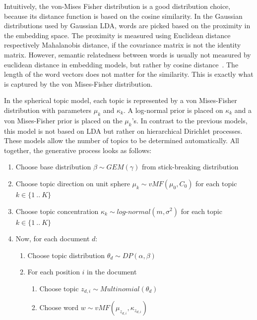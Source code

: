 \documentclass[
        a4paper,
        titlepage,
        twoside,
        parskip,
        numbers=noenddot
        ]{scrbook}
\theoremstyle{break}
\begin{document}
Intuitively, the von-Mises Fisher distribution is a good distribution choice, because its distance function is based on the cosine similarity.
In the Gaussian distributions used by Gaussian LDA, words are picked based on the proximity in the embedding space.
The proximity is measured using Euclidean distance respectively Mahalanobis distance, if the covariance matrix is not the identity matrix.
However, semantic relatedness between words is usually not measured by euclidean distance in embedding models, but rather by cosine distance~\cite{Mikolov2013a}.
The length of the word vectors does not matter for the similarity.
This is exactly what is captured by the von Mises-Fisher distribution.


In the spherical topic model, each topic is represented by a von Mises-Fisher distribution with parameters $\mu_k$ and $\kappa_k$.
A log-normal prior is placed on $\kappa_k$ and a von Mises-Fisher prior is placed on the $\mu_k$'s.
In contrast to the previous models, this model is not based on LDA but rather on hierarchical Dirichlet processes.
These models allow the number of topics to be determined automatically.
All together, the generative process looks as follows:
\begin{enumerate}
    \item Choose base distribution $\beta \sim GEM(\gamma)$ from stick-breaking distribution
    \item Choose topic direction on unit sphere $\mu_k \sim vMF(\mu_0, C_0)$ for each topic $k \in \{1~..~K\}$
    \item Choose topic concentration $\kappa_k \sim log\mbox{-}normal(m, \sigma^2)$ for each topic $k \in \{1~..~K\}$
    \item Now, for each document $d$:
    \begin{enumerate}
        \item Choose topic distribution $\theta_d \sim DP(\alpha, \beta)$
        \item For each position $i$ in the document
        \begin{enumerate}
            \item Choose topic $z_{d,i} \sim Multinomial(\theta_d)$
            \item Choose word $w \sim vMF(\mu_{z_{d,i}}, \kappa_{z_{d,i}})$
        \end{enumerate}
    \end{enumerate}
\end{enumerate}
\end{document}
